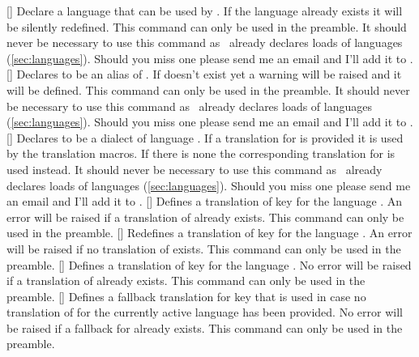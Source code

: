 \documentclass[load-preamble+,babel-options={french,spanish,ngerman,english}]{cnltx-doc}
\begin{document}
\begin{commands}
 []
   Declare a language that can be used by \translations.  If the language
   already exists it will be silently redefined.  This command can only be
   used in the preamble.  It should never be necessary to use this command as
   \translations\ already declares loads of languages (\cref{sec:languages}).
   Should you miss one please send me an email and I'll add it to
   \translations.
 []
   Declares  to be an alias of .  If 
   doesn't exist yet a warning will be raised and it will be defined.  This
   command can only be used in the preamble.  It should never be necessary to
   use this command as \translations\ already declares loads of languages
   (\cref{sec:languages}).  Should you miss one please send me an email and
   I'll add it to \translations.
 []
   Declares  to be a dialect of language .  If a
   translation for  is provided it is used by the translation
   macros.  If there is none the corresponding translation for 
   is used instead.  It should never be necessary to use this command as
   \translations\ already declares loads of languages (\cref{sec:languages}).
   Should you miss one please send me an email and I'll add it to
   \translations.
 []
   Defines a translation of key  for the language .
   An error will be raised if a translation of  already exists.
   This command can only be used in the preamble.
 []
   Redefines a translation of key  for the language .
   An error will be raised if no translation of  exists.
   This command can only be used in the preamble.
 []
   Defines a translation of key  for the language .
   No error will be raised if a translation of  already exists.
   This command can only be used in the preamble.
 []
   Defines a fallback translation for key  that is used in case no
   translation of  for the currently active language has been
   provided.  No error will be raised if a fallback for  already
   exists.  This command can only be used in the preamble.

\end{commands}
\end{document}
